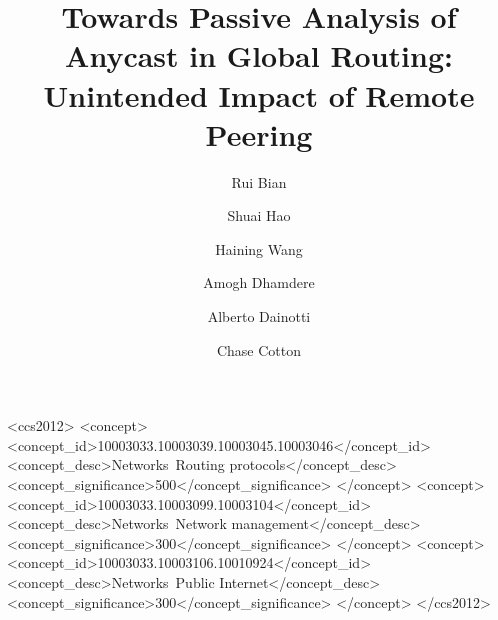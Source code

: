\documentclass[sigconf]{acmart}
\begin{document}
\title{Towards Passive Analysis of Anycast in Global Routing: Unintended Impact of Remote Peering}

\author{Rui Bian}

\author{Shuai Hao}

\author{Haining Wang}

\author{Amogh Dhamdere}

\author{Alberto Dainotti}

\author{Chase Cotton}



\begin{CCSXML}
<ccs2012>
<concept>
<concept_id>10003033.10003039.10003045.10003046</concept_id>
<concept_desc>Networks~Routing protocols</concept_desc>
<concept_significance>500</concept_significance>
</concept>
<concept>
<concept_id>10003033.10003099.10003104</concept_id>
<concept_desc>Networks~Network management</concept_desc>
<concept_significance>300</concept_significance>
</concept>
<concept>
<concept_id>10003033.10003106.10010924</concept_id>
<concept_desc>Networks~Public Internet</concept_desc>
<concept_significance>300</concept_significance>
</concept>
</ccs2012>
\end{CCSXML}



\maketitle








\end{document}
